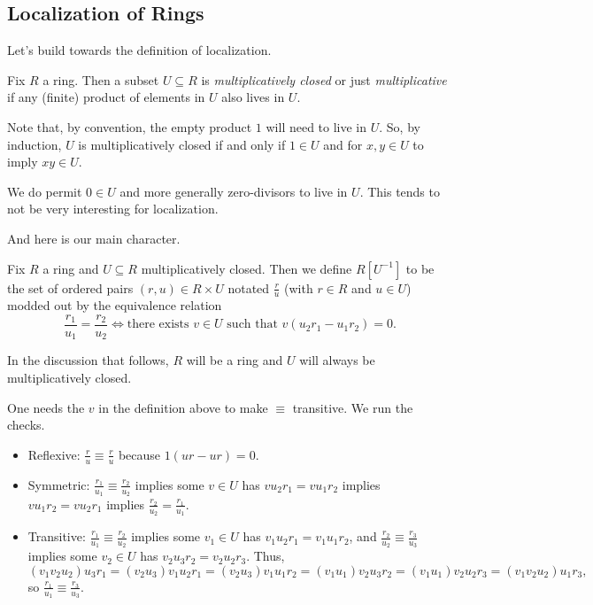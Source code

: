 \subsection{Localization of Rings}
Let's build towards the definition of localization.
\begin{definition}
	Fix $R$ a ring. Then a subset $U\subseteq R$ is \textit{multiplicatively closed} or just \textit{multiplicative} if any (finite) product of elements in $U$ also lives in $U$.
\end{definition}
Note that, by convention, the empty product $1$ will need to live in $U$. So, by induction, $U$ is multiplicatively closed if and only if $1\in U$ and for $x,y\in U$ to imply $xy\in U$.
\begin{remark}
	We do permit $0\in U$ and more generally zero-divisors to live in $U$. This tends to not be very interesting for localization.
\end{remark}
And here is our main character.
\begin{definition}
	Fix $R$ a ring and $U\subseteq R$ multiplicatively closed. Then we define $R\left[U^{-1}\right]$ to be the set of ordered pairs $(r,u)\in R\times U$ notated $\frac ru$ (with $r\in R$ and $u\in U$) modded out by the equivalence relation
	\[\frac{r_1}{u_1}=\frac{r_2}{u_2}\iff\text{there exists }v\in U\text{ such that }v(u_2r_1-u_1r_2)=0.\]
\end{definition}
In the discussion that follows, $R$ will be a ring and $U$ will always be multiplicatively closed.
\begin{remark}[Nir] \label{lem:localizeequiv}
	One needs the $v$ in the definition above to make $\equiv$ transitive. We run the checks.
	\begin{itemize}
		\item Reflexive: $\frac ru\equiv\frac ru$ because $1(ur-ur)=0$.
		\item Symmetric: $\frac{r_1}{u_1}\equiv\frac{r_2}{u_2}$ implies some $v\in U$ has $vu_2r_1=vu_1r_2$ implies $vu_1r_2=vu_2r_1$ implies $\frac{r_2}{u_2}=\frac{r_1}{u_1}$.
		\item Transitive: $\frac{r_1}{u_1}\equiv\frac{r_2}{u_2}$ implies some $v_1\in U$ has $v_1u_2r_1=v_1u_1r_2$, and $\frac{r_2}{u_2}\equiv\frac{r_3}{u_3}$ implies some $v_2\in U$ has $v_2u_3r_2=v_2u_2r_3$. Thus,
		\[(v_1v_2u_2)u_3r_1=(v_2u_3)v_1u_2r_1=(v_2u_3)v_1u_1r_2=(v_1u_1)v_2u_3r_2=(v_1u_1)v_2u_2r_3=(v_1v_2u_2)u_1r_3,\]
		so $\frac{r_1}{u_1}\equiv\frac{r_3}{u_3}$.
	\end{itemize}
\end{remark}

